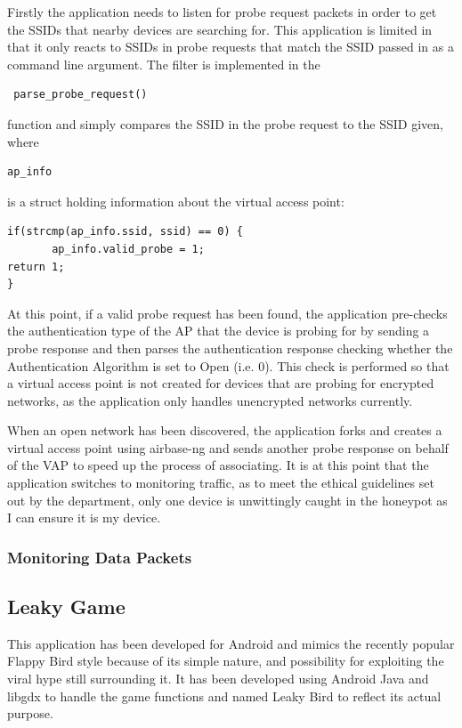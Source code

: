 Firstly the application needs to listen for probe request packets in order to get the SSIDs that nearby devices are searching for. This application is limited in that it only reacts to SSIDs in probe requests that match the SSID passed in as a command line argument. The filter is implemented in the\begin{verbatim} parse_probe_request() \end{verbatim}function and simply compares the SSID in the probe request to the SSID given, where \begin{verbatim}ap_info\end{verbatim} is a struct holding information about the virtual access point:
\begin{verbatim}
if(strcmp(ap_info.ssid, ssid) == 0) {
       ap_info.valid_probe = 1;
return 1;
}
\end{verbatim}
At this point, if a valid probe request has been found, the application pre-checks the authentication type of the AP that the device is probing for by sending a probe response and then parses the authentication response checking whether the Authentication Algorithm is set to Open (i.e. 0). This check is performed so that a virtual access point is not created for devices that are probing for encrypted networks, as the application only handles unencrypted networks currently.

When an open network has been discovered, the application forks and creates a virtual access point using airbase-ng and sends another probe response on behalf of the VAP to speed up the process of associating. It is at this point that the application switches to monitoring traffic, as to meet the ethical guidelines set out by the department, only one device is unwittingly caught in the honeypot as I can ensure it is my device.

\subsubsection{Monitoring Data Packets}

\subsection{Leaky Game}
This application has been developed for Android and mimics the recently popular Flappy Bird style because of its simple nature, and possibility for exploiting the viral hype still surrounding it. It has been developed using Android Java and libgdx to handle the game functions and named Leaky Bird to reflect its actual purpose.

